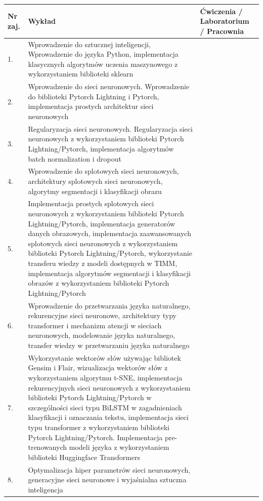 \documentclass[12pt, a4paper]{article}
\begin{document}
\begin{longtable}{|p{1.5cm}|p{6.5cm}|p{6.5cm}|}
\hline
\textbf{Nr zaj.} & \textbf{Wykład} & \textbf{Ćwiczenia / Laboratorium / Pracownia} \\\hline
\endhead
  \hline
  1. & Wprowadzenie do sztucznej inteligencji, Wprowadzenie do języka Python, implementacja klasycznych algorytmów uczenia maszynowego z wykorzystaniem biblioteki sklearn &  \\
  \hline
  2. & Wprowadzenie do sieci neuronowych. Wprowadzenie do biblioteki Pytorch Lightning i Pytorch, implementacja prostych architektur sieci neuronowych &  \\
  \hline
  3. & Regularyzacja sieci neuronowych. Regularyzacja sieci neuronowych z wykorzystaniem biblioteki Pytorch Lightning/Pytorch, implementacja algorytmów batch normalization i dropout &  \\
  \hline
  4. & Wprowadzenie do splotowych sieci neuronowych, architektury splotowych sieci neuronowych, algorytmy segmentacji i klasyfikacji obrazu &  \\
  \hline
  5. & Implementacja prostych splotowych sieci neuronowych z wykorzystaniem biblioteki Pytorch Lightning/Pytorch, implementacja generatorów danych obrazowych, implementacja zaawansowanych splotowych sieci neuronowych z wykorzystaniem biblioteki Pytorch Lightning/Pytorch, wykorzystanie transferu wiedzy z modeli dostępnych w TIMM, implementacja algorytmów segmentacji i klasyfikacji obrazów z wykorzystaniem biblioteki Pytorch Lightning/Pytorch &  \\
  \hline
  6. & Wprowadzenie do przetwarzania języka naturalnego, rekurencyjne sieci neuronowe, architektury typy transformer i mechanizm atencji w sieciach neuronowych, modelowanie języka naturalnego, transfer wiedzy w przetwarzaniu języka naturalnego &  \\
  \hline
  7. & Wykorzystanie wektorów słów używając bibliotek Gensim i Flair, wizualizacja wektorów słów z wykorzystaniem algorytmu t-SNE, implementacja rekurencyjnych sieci neuronowych z wykorzystaniem biblioteki Pytorch Lightning/Pytorch w szczególności sieci typu BiLSTM w zagadnieniach klasyfikacji i oznaczania tekstu, implementacja sieci typu transformer z wykorzystaniem biblioteki Pytorch Lightning/Pytorch. Implementacja pre-trenowanych modeli języka z wykorzystaniem biblioteki Huggingface Transformers &  \\
  \hline
  8. & Optymalizacja hiper parametrów sieci neuronowych, generacyjne sieci neuronowe i wyjaśnialna sztuczna inteligencja &  \\

\end{longtable}
\end{document}
